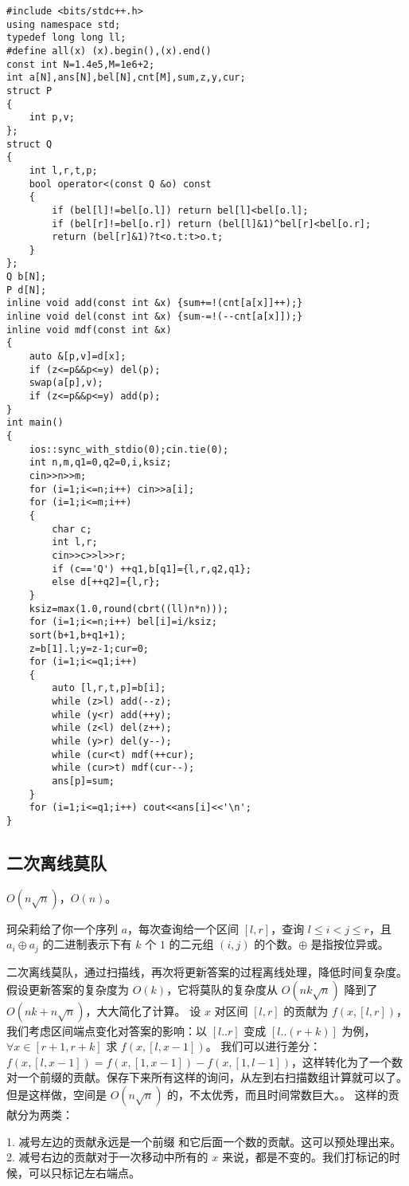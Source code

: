 \documentclass{ctexart}
\begin{document}
\begin{lstlisting}
#include <bits/stdc++.h>
using namespace std;
typedef long long ll;
#define all(x) (x).begin(),(x).end()
const int N=1.4e5,M=1e6+2;
int a[N],ans[N],bel[N],cnt[M],sum,z,y,cur;
struct P
{
	int p,v;
};
struct Q
{
	int l,r,t,p;
	bool operator<(const Q &o) const
	{
		if (bel[l]!=bel[o.l]) return bel[l]<bel[o.l];
		if (bel[r]!=bel[o.r]) return (bel[l]&1)^bel[r]<bel[o.r];
		return (bel[r]&1)?t<o.t:t>o.t;
	}
};
Q b[N];
P d[N];
inline void add(const int &x) {sum+=!(cnt[a[x]]++);}
inline void del(const int &x) {sum-=!(--cnt[a[x]]);}
inline void mdf(const int &x)
{
	auto &[p,v]=d[x];
	if (z<=p&&p<=y) del(p);
	swap(a[p],v);
	if (z<=p&&p<=y) add(p);
}
int main()
{
	ios::sync_with_stdio(0);cin.tie(0);
	int n,m,q1=0,q2=0,i,ksiz;
	cin>>n>>m;
	for (i=1;i<=n;i++) cin>>a[i];
	for (i=1;i<=m;i++)
	{
		char c;
		int l,r;
		cin>>c>>l>>r;
		if (c=='Q') ++q1,b[q1]={l,r,q2,q1};
		else d[++q2]={l,r};
	}
	ksiz=max(1.0,round(cbrt((ll)n*n)));
	for (i=1;i<=n;i++) bel[i]=i/ksiz;
	sort(b+1,b+q1+1);
	z=b[1].l;y=z-1;cur=0;
	for (i=1;i<=q1;i++)
	{
		auto [l,r,t,p]=b[i];
		while (z>l) add(--z);
		while (y<r) add(++y);
		while (z<l) del(z++);
		while (y>r) del(y--);
		while (cur<t) mdf(++cur);
		while (cur>t) mdf(cur--);
		ans[p]=sum;
	}
	for (i=1;i<=q1;i++) cout<<ans[i]<<'\n';
}

\end{lstlisting}

\subsection{二次离线莫队}

$O(n\sqrt n)$，$O(n)$。

珂朵莉给了你一个序列 $a$，每次查询给一个区间 $[l,r]$，查询 $l \leq i< j \leq r$，且 $a_i \oplus a_j$ 的二进制表示下有 $k$ 个 $1$ 的二元组 $(i,j)$ 的个数。$\oplus$ 是指按位异或。

二次离线莫队，通过扫描线，再次将更新答案的过程离线处理，降低时间复杂度。假设更新答案的复杂度为 $O(k)$，它将莫队的复杂度从 $O(nk\sqrt n)$ 降到了 $O(nk + n\sqrt n)$，大大简化了计算。
设 $x$ 对区间 $[l,r]$ 的贡献为 $f(x,[l,r])$，我们考虑区间端点变化对答案的影响：以 $[l..r]$ 变成 $[l..(r+k)]$ 为例，$\forall x \in [r+1,r+k]$ 求 $f(x,[l,x-1])$。
我们可以进行差分：$f(x,[l,x-1])=f(x,[1,x-1])-f(x,[1,l-1])$，这样转化为了一个数对一个前缀的贡献。保存下来所有这样的询问，从左到右扫描数组计算就可以了。  
但是这样做，空间是 $O(n\sqrt n)$ 的，不太优秀，而且时间常数巨大。。
这样的贡献分为两类：

1. 减号左边的贡献永远是一个前缀 和它后面一个数的贡献。这可以预处理出来。
2. 减号右边的贡献对于一次移动中所有的 $x$ 来说，都是不变的。我们打标记的时候，可以只标记左右端点。
\end{document}

